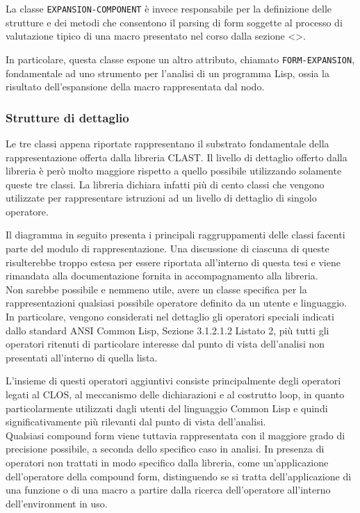 La classe \texttt{EXPANSION-COMPONENT} è invece responsabile per la
definizione delle strutture e dei metodi che consentono il parsing di form
soggette al processo di valutazione tipico di una macro presentato nel corso
dalla sezione <>.

In particolare, questa classe espone un altro attributo, chiamato \texttt
{FORM-EXPANSION}, fondamentale ad uno strumento per l’analisi di un programma
Lisp, ossia la risultato dell’espansione della macro rappresentata dal nodo.\\

\subsubsection{Strutture di dettaglio}

Le tre classi appena riportate rappresentano il substrato fondamentale della
rappresentazione offerta dalla libreria CLAST. Il livello di dettaglio offerto
dalla libreria è però molto maggiore rispetto a quello possibile utilizzando
solamente queste tre classi. La libreria dichiara infatti più di cento classi
che vengono utilizzate per rappresentare istruzioni ad un livello di dettaglio
di singolo operatore.

Il diagramma in seguito presenta i principali raggruppamenti delle classi
facenti parte del modulo di rappresentazione. Una discussione di ciascuna di
queste risulterebbe troppo estesa per essere riportata all’interno di questa
tesi e viene rimandata alla documentazione fornita in accompagnamento alla
libreria.\\

Non sarebbe possibile e nemmeno utile, avere un classe specifica per la
rappresentazioni qualsiasi possibile operatore definito da un utente e
linguaggio. In particolare, vengono considerati nel dettaglio gli operatori
speciali indicati dallo standard ANSI Common Lisp, Sezione 3.1.2.1.2 Listato
2, più tutti gli operatori ritenuti di particolare interesse dal punto di
vista dell’analisi non presentati all’interno di quella lista.

L'insieme di questi operatori aggiuntivi consiste principalmente degli
operatori legati al CLOS, al meccanismo delle dichiarazioni e al costrutto
loop, in quanto particolarmente utilizzati dagli utenti del linguaggio Common
Lisp e quindi significativamente più rilevanti dal punto di vista
dell’analisi.\\

Qualsiasi compound form viene tuttavia rappresentata con il maggiore grado di
precisione possibile, a seconda dello specifico caso in analisi. In presenza
di operatori non trattati in modo specifico dalla libreria, come
un'applicazione dell'operatore della compound form, distinguendo se si tratta
dell’applicazione di una funzione o di una macro a partire dalla ricerca
dell'operatore all'interno dell'environment in uso.
